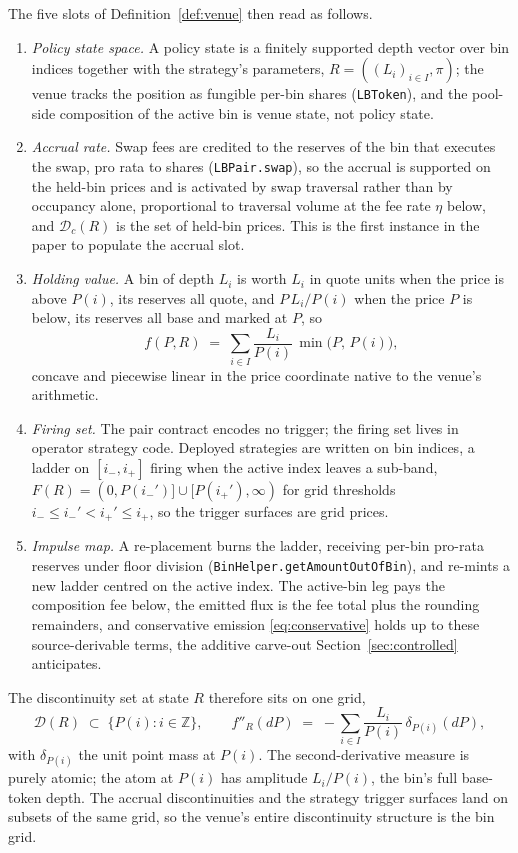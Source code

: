 \documentclass[11pt,a4paper]{article}
\theoremstyle{definition}
\theoremstyle{plain}
\theoremstyle{remark}
\begin{document}
The five slots of Definition~\ref{def:venue} then read as follows.
\begin{enumerate}[label=(\roman*)]
\item \emph{Policy state space.} A policy state is a finitely supported depth vector over bin indices together with the strategy's parameters, $R = ((L_i)_{i \in I}, \pi)$; the venue tracks the 
position as fungible per-bin shares (\texttt{LBToken}), and the pool-side composition of the active bin is venue state, not policy state.
\item \emph{Accrual rate.} Swap fees are credited to the reserves of the bin that executes the swap, pro rata to shares (\texttt{LBPair.swap}), so the accrual is supported on the held-bin prices 
and is activated by swap traversal rather than by occupancy alone, proportional to traversal volume at the fee rate $\eta$ below, and $\mathcal{D}_c(R)$ is the set of held-bin prices. This is the 
first instance in the paper to populate the accrual slot.
\item \emph{Holding value.} A bin of depth $L_i$ is worth $L_i$ in quote units when the price is above $P(i)$, its reserves all quote, and $P\,L_i/P(i)$ when the price $P$ is below, its reserves 
all base and marked at $P$, so
\[
f(P, R) \;=\; \sum_{i \in I} \frac{L_i}{P(i)}\, \min\big(P,\,
P(i)\big),
\]
concave and piecewise linear in the price coordinate native to the venue's arithmetic.
\item \emph{Firing set.} The pair contract encodes no trigger; the firing set lives in operator strategy code. Deployed strategies are written on bin indices, a ladder on $[i_-, i_+]$ firing when 
the active index leaves a sub-band, $F(R) = (0, P(i_-')] \cup [P(i_+'), \infty)$ for grid thresholds $i_- \le i_-' < i_+' \le i_+$, so the trigger surfaces are grid prices.
\item \emph{Impulse map.} A re-placement burns the ladder, receiving per-bin pro-rata reserves under floor division (\texttt{BinHelper.getAmountOutOfBin}), and re-mints a new ladder centred on the 
active index. The active-bin leg pays the composition fee below, the emitted flux is the fee total plus the rounding remainders, and conservative emission \eqref{eq:conservative} holds up to these 
source-derivable terms, the additive carve-out Section~\ref{sec:controlled} anticipates.
\end{enumerate}

The discontinuity set at state $R$ therefore sits on one grid,
\[
\mathcal{D}(R) \;\subset\; \{P(i) : i \in \mathbb{Z}\},
\qquad
f''_R(dP) \;=\; -\sum_{i \in I} \frac{L_i}{P(i)}\,
\delta_{P(i)}(dP),
\]
with $\delta_{P(i)}$ the unit point mass at $P(i)$. The second-derivative measure is purely atomic; the atom at $P(i)$ has amplitude $L_i/P(i)$, the bin's full base-token depth. The accrual 
discontinuities and the strategy trigger surfaces land on subsets of the same grid, so the venue's entire discontinuity structure is the bin grid.
\end{document}
